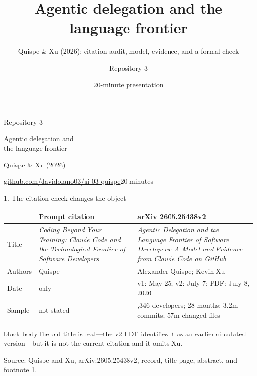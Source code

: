 \documentclass[aspectratio=169,10pt]{beamer}
\title{Agentic delegation and the language frontier}
\subtitle{Quispe \& Xu (2026): citation audit, model, evidence, and a formal check}
\author{Repository 3}
\date{20-minute presentation}
\newcommand{\source}[1]{\vfill{\color{muted}\tiny Source: #1\par}}
\newcommand{\resultbox}[1]{\begin{beamercolorbox}[rounded=true,sep=0.55em,wd=\linewidth]{block body}#1\end{beamercolorbox}}
\begin{document}
\begin{frame}[plain]
  \vspace{0.55cm}
  {\color{teal}\large Repository 3}\par\vspace{0.35cm}
  {\color{navy}Agentic delegation and\\the language frontier}\par\vspace{0.45cm}
  {\large Quispe \& Xu (2026)}\par\vspace{0.8cm}
  \vfill
  {\small\href{https://github.com/davidolano03/ai-03-quispe}{github.com/davidolano03/ai-03-quispe}}\hfill{\small 20 minutes}
\end{frame}

\begin{frame}{1. The citation check changes the object}
  \small
  \begin{tabular}{@{}>{\raggedright\arraybackslash}p{1.4cm}>{\raggedright\arraybackslash}p{4.4cm}>{\raggedright\arraybackslash}p{7.0cm}@{}}
    \toprule
    & \textbf{Prompt citation} & \textbf{arXiv 2605.25438v2} \\
    \midrule
    Title & \emph{Coding Beyond Your Training: Claude Code and the Technological Frontier of Software Developers} & \emph{Agentic Delegation and the Language Frontier of Software Developers: A Model and Evidence from Claude Code on GitHub} \\
    Authors & Quispe & Alexander Quispe; Kevin Xu \\
    Date & 2026 only & v1: May 25; v2: July 7; PDF: July 8, 2026 \\
    Sample & not stated & 5,346 developers; 28 months; 3.2m commits; 57m changed files \\
    \bottomrule
  \end{tabular}
  \vspace{0.55cm}
  \resultbox{The old title is real---the v2 PDF identifies it as an earlier circulated version---but it is not the current citation and it omits Xu.}
  \source{Quispe and Xu, arXiv:2605.25438v2, record, title page, abstract, and footnote 1.}
\end{frame}
\end{document}

